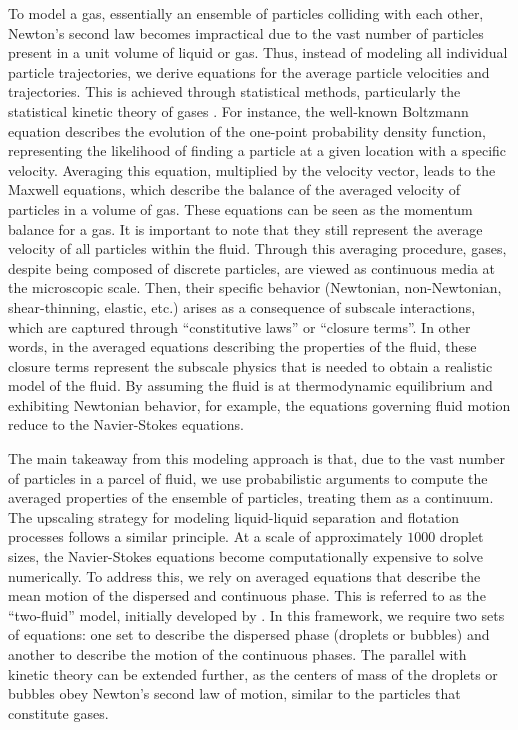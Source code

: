 To model a gas, essentially an ensemble of particles colliding with each other, Newton's second law becomes impractical due to the vast number of particles present in a unit volume of liquid or gas.
Thus, instead of modeling all individual particle trajectories, we derive equations for the average particle velocities and trajectories.
This is achieved through statistical methods, particularly the statistical kinetic theory of gases \citep{hansen2013theory,kardar2007statistical}.
For instance, the well-known Boltzmann equation describes the evolution of the one-point probability density function, representing the likelihood of finding a particle at a given location with a specific velocity.
Averaging this equation, multiplied by the velocity vector, leads to the Maxwell equations, which describe the balance of the averaged velocity of particles in a volume of gas.
These equations can be seen as the momentum balance for a gas.
It is important to note that they still represent the average velocity of all particles within the fluid.
Through this averaging procedure, gases, despite being composed of discrete particles, are viewed as continuous media at the microscopic scale.
Then, their specific behavior (Newtonian, non-Newtonian, shear-thinning, elastic, etc.) arises as a consequence of subscale interactions, which are captured through ``constitutive laws'' or ``closure terms''.
In other words, in the averaged equations describing the properties of the fluid, these closure terms represent the subscale physics that is needed to obtain a realistic model of the fluid.
By assuming the fluid is at thermodynamic equilibrium and exhibiting Newtonian behavior, for example, the equations governing fluid motion reduce to the Navier-Stokes equations. 

The main takeaway from this modeling approach is that, due to the vast number of particles in a parcel of fluid, we use probabilistic arguments to compute the averaged properties of the ensemble of particles, treating them as a continuum.
The upscaling strategy for modeling liquid-liquid separation and flotation processes follows a similar principle.
At a scale of approximately $1000$ droplet sizes, the Navier-Stokes equations become computationally expensive to solve numerically.
To address this, we rely on averaged equations that describe the mean motion of the dispersed and continuous phase.
This is referred to as the ``two-fluid'' model, initially developed by \citet{drew1983mathematical}.
In this framework, we require two sets of equations: one set to describe the dispersed phase (droplets or bubbles) and another to describe the motion of the continuous phases.
The parallel with kinetic theory can be extended further, as the centers of mass of the droplets or bubbles obey Newton's second law of motion, similar to the particles that constitute gases.


